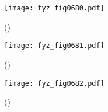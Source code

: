     \begin{figure}[ht!] %
      \centering
      \texttt{[image: fyz\_fig0680.pdf]}
      \caption{
               (\cite[s.~707]{Feynman02})}
      \label{fyz:fig0680}
    \end{figure}

    \begin{figure}[ht!] %
      \centering
      \texttt{[image: fyz\_fig0681.pdf]}
      \caption{
               (\cite[s.~707]{Feynman02})}
      \label{fyz:fig0681}
    \end{figure}

    \begin{figure}[ht!] %
      \centering
      \texttt{[image: fyz\_fig0682.pdf]}
      \caption{
               (\cite[s.~707]{Feynman02})}
      \label{fyz:fig0682}
    \end{figure}


